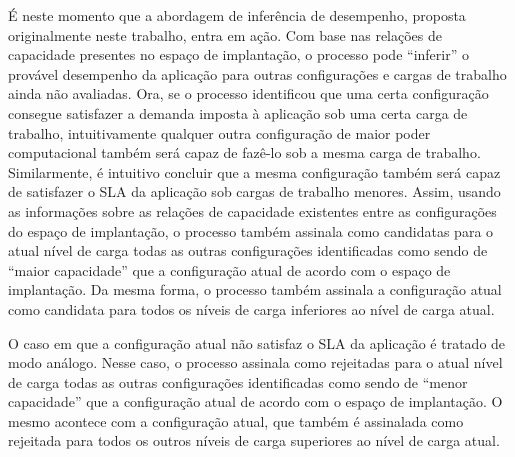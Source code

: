 \documentclass[12pt]{article}
\begin{document}
É neste momento que a abordagem de inferência de desempenho, proposta originalmente neste trabalho, entra em ação. Com base nas relações de capacidade presentes no espaço de implantação, o processo pode ``inferir'' o provável desempenho da aplicação para outras configurações e cargas de trabalho ainda não avaliadas. Ora, se o processo identificou que uma certa configuração consegue satisfazer a demanda imposta à aplicação sob uma certa carga de trabalho, intuitivamente qualquer outra configuração de maior poder computacional também será capaz de fazê-lo sob a mesma carga de trabalho. Similarmente, é intuitivo concluir que a mesma configuração também será capaz de satisfazer o SLA da aplicação sob cargas de trabalho menores. Assim, usando as informações sobre as relações de capacidade existentes entre as configurações do espaço de implantação, o processo também assinala como candidatas para o atual nível de carga todas as outras configurações identificadas como sendo de ``maior capacidade'' que a configuração atual de acordo com o espaço de implantação. Da mesma forma, o processo também assinala a configuração atual como candidata para todos os níveis de carga inferiores ao nível de carga atual.

O caso em que a configuração atual não satisfaz o SLA  da aplicação é tratado de modo análogo. Nesse caso, o processo assinala como rejeitadas para o atual nível de carga todas as outras configurações identificadas como sendo de ``menor capacidade'' que a configuração atual de acordo com o espaço de implantação. O mesmo acontece com a configuração atual, que também é assinalada como rejeitada para todos os outros níveis de carga superiores ao nível de carga atual.
\end{document}
